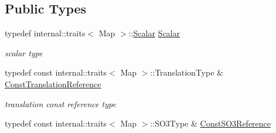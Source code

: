 \subsection*{Public Types}
\begin{DoxyCompactItemize}
\item 
typedef internal\+::traits$<$ Map $>$\+::\hyperlink{class_eigen_1_1_map_3_01const_01_sophus_1_1_s_e3_group_3_01___scalar_01_4_00_01___options_01_4_a24b7cfd38fbe43026ced1fab3cc19584}{Scalar} \hyperlink{class_eigen_1_1_map_3_01const_01_sophus_1_1_s_e3_group_3_01___scalar_01_4_00_01___options_01_4_a24b7cfd38fbe43026ced1fab3cc19584}{Scalar}\hypertarget{class_eigen_1_1_map_3_01const_01_sophus_1_1_s_e3_group_3_01___scalar_01_4_00_01___options_01_4_a24b7cfd38fbe43026ced1fab3cc19584}{}\label{class_eigen_1_1_map_3_01const_01_sophus_1_1_s_e3_group_3_01___scalar_01_4_00_01___options_01_4_a24b7cfd38fbe43026ced1fab3cc19584}

\begin{DoxyCompactList}\small\item\em scalar type \end{DoxyCompactList}\item 
typedef const internal\+::traits$<$ Map $>$\+::Translation\+Type \& \hyperlink{class_eigen_1_1_map_3_01const_01_sophus_1_1_s_e3_group_3_01___scalar_01_4_00_01___options_01_4_a30dee589eb6520b39aaeabefb7685a98}{Const\+Translation\+Reference}\hypertarget{class_eigen_1_1_map_3_01const_01_sophus_1_1_s_e3_group_3_01___scalar_01_4_00_01___options_01_4_a30dee589eb6520b39aaeabefb7685a98}{}\label{class_eigen_1_1_map_3_01const_01_sophus_1_1_s_e3_group_3_01___scalar_01_4_00_01___options_01_4_a30dee589eb6520b39aaeabefb7685a98}

\begin{DoxyCompactList}\small\item\em translation const reference type \end{DoxyCompactList}\item 
typedef const internal\+::traits$<$ Map $>$\+::S\+O3\+Type \& \hyperlink{class_eigen_1_1_map_3_01const_01_sophus_1_1_s_e3_group_3_01___scalar_01_4_00_01___options_01_4_adfa2d5c638577360f8069013cc5059aa}{Const\+S\+O3\+Reference}\hypertarget{class_eigen_1_1_map_3_01const_01_sophus_1_1_s_e3_group_3_01___scalar_01_4_00_01___options_01_4_adfa2d5c638577360f8069013cc5059aa}{}\label{class_eigen_1_1_map_3_01const_01_sophus_1_1_s_e3_group_3_01___scalar_01_4_00_01___options_01_4_adfa2d5c638577360f8069013cc5059aa}


\end{DoxyCompactItemize}
